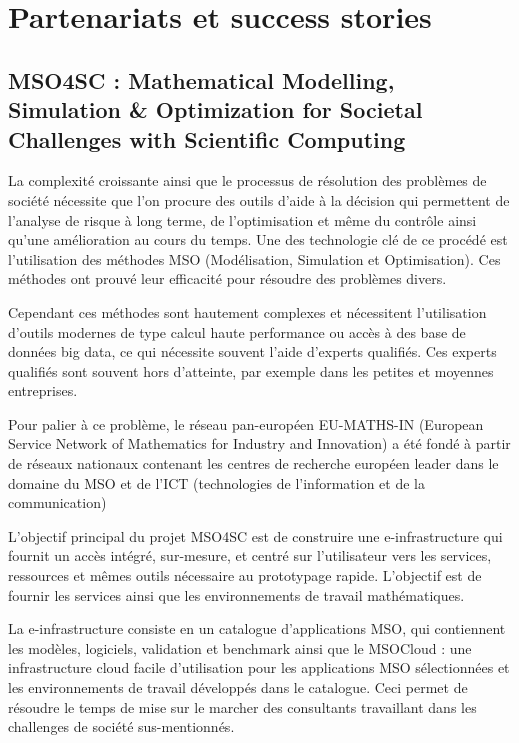 \section*{Partenariats et success stories}

\subsection*{MSO4SC : Mathematical Modelling, Simulation \& Optimization for Societal Challenges with Scientific Computing}

La complexité croissante ainsi que le processus de résolution des problèmes de société nécessite que l'on procure des outils d'aide à la décision qui permettent de l'analyse de risque à long terme, de l'optimisation et même du contrôle ainsi qu'une amélioration au cours du temps.
Une des technologie clé de ce procédé est l'utilisation des méthodes MSO (Modélisation, Simulation et Optimisation). Ces méthodes ont prouvé leur efficacité pour résoudre des problèmes divers.

Cependant ces méthodes sont hautement complexes et nécessitent l'utilisation d'outils modernes de type calcul haute performance ou accès à des base de données big data, ce qui nécessite souvent l'aide d'experts qualifiés. Ces experts qualifiés sont souvent hors d'atteinte, par exemple dans les petites et moyennes entreprises.

Pour palier à ce problème, le réseau pan-européen EU-MATHS-IN (European Service Network of Mathematics for Industry and Innovation) a été fondé à partir de réseaux nationaux contenant les centres de recherche européen leader dans le domaine du MSO et de l'ICT (technologies de l'information et de la communication)

L'objectif principal du projet MSO4SC est de construire une e-infrastructure qui fournit un accès intégré, sur-mesure, et centré sur l'utilisateur vers les services, ressources et mêmes outils nécessaire au prototypage rapide. L'objectif est de fournir les services ainsi que les environnements de travail mathématiques.

La e-infrastructure consiste en un catalogue d'applications MSO, qui contiennent les modèles, logiciels, validation et benchmark ainsi que le MSOCloud : une infrastructure cloud facile d'utilisation pour les applications MSO sélectionnées et les environnements de travail développés dans le catalogue.
Ceci permet de résoudre le temps de mise sur le marcher des consultants travaillant dans les challenges de société sus-mentionnés.

